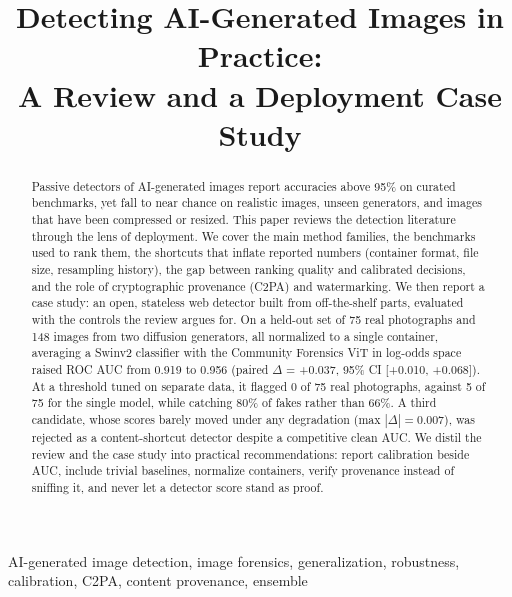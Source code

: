 \documentclass[conference]{IEEEtran}
\begin{document}
\title{Detecting AI-Generated Images in Practice:\\
A Review and a Deployment Case Study}

\author{
}

\maketitle

\begin{abstract}
Passive detectors of AI-generated images report accuracies above 95\% on
curated benchmarks, yet fall to near chance on realistic images, unseen
generators, and images that have been compressed or resized. This paper
reviews the detection literature through the lens of deployment. We cover
the main method families, the benchmarks used to rank them, the shortcuts
that inflate reported numbers (container format, file size, resampling
history), the gap between ranking quality and calibrated decisions, and the
role of cryptographic provenance (C2PA) and watermarking. We then report a
case study: an open, stateless web detector built from off-the-shelf parts,
evaluated with the controls the review argues for. On a held-out set of 75
real photographs and 148 images from two diffusion generators, all
normalized to a single container, averaging a Swinv2 classifier with the
Community Forensics ViT in log-odds space raised ROC AUC from 0.919 to 0.956
(paired $\Delta$ = +0.037, 95\% CI [+0.010, +0.068]). At a threshold tuned
on separate data, it flagged 0 of 75 real photographs, against 5 of 75 for
the single model, while catching 80\% of fakes rather than 66\%. A third
candidate, whose scores barely moved under any degradation (max
$|\Delta| = 0.007$), was rejected as a content-shortcut detector despite a
competitive clean AUC. We distil the review and the case study into
practical recommendations: report calibration beside AUC, include trivial
baselines, normalize containers, verify provenance instead of sniffing it,
and never let a detector score stand as proof.
\end{abstract}

\begin{IEEEkeywords}
AI-generated image detection, image forensics, generalization, robustness,
calibration, C2PA, content provenance, ensemble
\end{IEEEkeywords}
\end{document}
